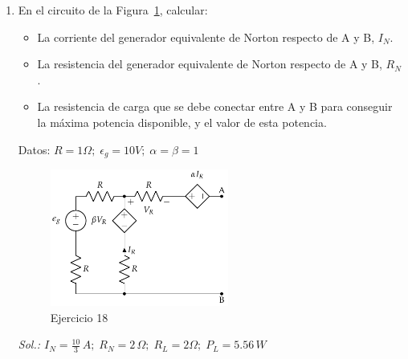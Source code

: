 \begin{enumerate}
  \item En el circuito de la Figura~\ref{fig.norton_ej}, calcular:
    \begin{itemize}
    \item La corriente del generador equivalente de Norton respecto de
      A y B, $I_N$.
    \item La resistencia del generador equivalente de Norton respecto
      de A y B, $R_N$.
    \item La resistencia de carga que se debe conectar entre A y B
      para conseguir la máxima potencia disponible, y el valor de esta
      potencia.
    \end{itemize}

    Datos:
    $R = {1}{\Omega};\; \epsilon_g = {10}{V};\; \alpha = \beta = 1$

\begin{figure}[H]
  \centering \includegraphics[height=4.5cm]{../figs/norton.pdf}
  \caption{Ejercicio 18}
  \label{fig.norton_ej}
\end{figure}

\emph{Sol.:
  $I_N=\frac{10}{3}\,A;\; R_N=2\,\Omega;\; R_L=2\Omega;\;
  P_L=5.56\,W$}




\end{enumerate}
